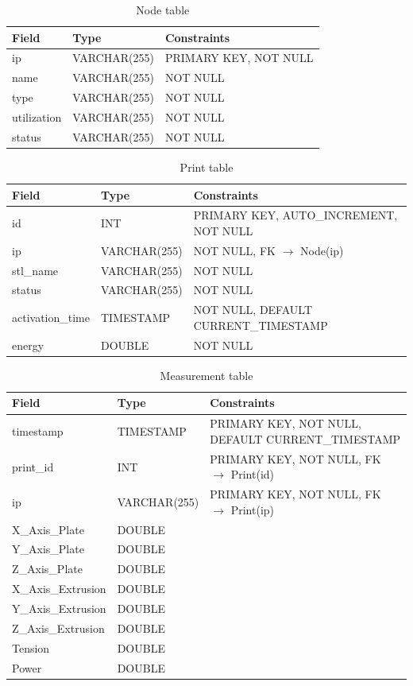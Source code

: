 \begin{table}[H]
	\centering
	\footnotesize
	\caption{Node table}
	\begin{tabular}{lll}
		\toprule
		\textbf{Field} & \textbf{Type} & \textbf{Constraints} \\
		\midrule
		ip & VARCHAR(255) & PRIMARY KEY, NOT NULL \\
		name & VARCHAR(255) & NOT NULL \\
		type & VARCHAR(255) & NOT NULL \\
		utilization & VARCHAR(255) & NOT NULL \\
		status & VARCHAR(255) & NOT NULL \\
		\bottomrule
	\end{tabular}
\end{table}

\begin{table}[H]
	\centering
	\footnotesize
	\caption{Print table}
	\begin{tabular}{lll}
		\toprule
		\textbf{Field} & \textbf{Type} & \textbf{Constraints} \\
		\midrule
		id & INT & PRIMARY KEY, AUTO\_INCREMENT, NOT NULL \\
		ip & VARCHAR(255) & NOT NULL, FK $\rightarrow$ Node(ip) \\
		stl\_name & VARCHAR(255) & NOT NULL \\
		status & VARCHAR(255) & NOT NULL \\
		activation\_time & TIMESTAMP & NOT NULL, DEFAULT CURRENT\_TIMESTAMP \\
		energy & DOUBLE & NOT NULL \\
		\bottomrule
	\end{tabular}
\end{table}

\begin{table}[H]
	\centering
	\footnotesize
	\caption{Measurement table}
	\begin{tabular}{lll}
		\toprule
		\textbf{Field} & \textbf{Type} & \textbf{Constraints} \\
		\midrule
		timestamp & TIMESTAMP & PRIMARY KEY, NOT NULL, DEFAULT CURRENT\_TIMESTAMP \\
		print\_id & INT & PRIMARY KEY, NOT NULL, FK $\rightarrow$ Print(id) \\
		ip & VARCHAR(255) & PRIMARY KEY, NOT NULL, FK $\rightarrow$ Print(ip) \\
		X\_Axis\_Plate & DOUBLE &  \\
		Y\_Axis\_Plate & DOUBLE &  \\
		Z\_Axis\_Plate & DOUBLE &  \\
		X\_Axis\_Extrusion & DOUBLE &  \\
		Y\_Axis\_Extrusion & DOUBLE &  \\
		Z\_Axis\_Extrusion & DOUBLE &  \\
		Tension & DOUBLE &  \\
		Power & DOUBLE &  \\
		\bottomrule
	\end{tabular}
\end{table}

